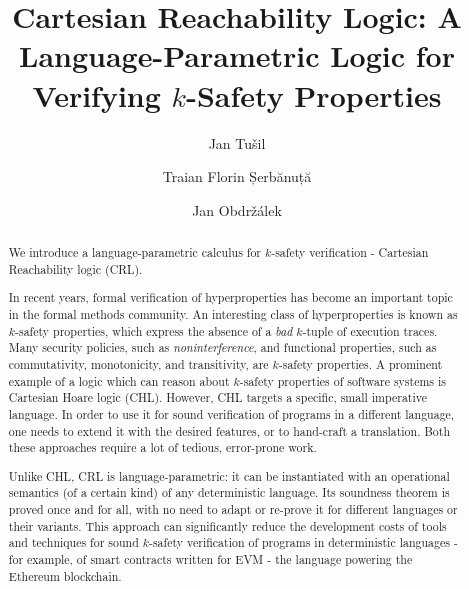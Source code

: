 \documentclass{easychair}
\title{Cartesian Reachability Logic: A Language-Parametric Logic for Verifying $k$-Safety Properties}
\author{
  Jan Tu\v{s}il \inst{1}
  \and Traian Florin Șerbănuță  \inst{2}
  \and Jan Obdržálek \inst{1}
}
\institute{
  Masaryk University,
  Brno, Czech Republic\\
  \email{jan.tusil@mail.muni.cz,obdrzalek@fi.muni.cz}
\and
   University of Bucharest,
   Bucharest, Romania\\
   \email{traian.serbanuta@unibuc.ro}\\
 }
\begin{document}
\maketitle


\begin{abstract}

  We introduce a language-parametric calculus
  for $k$-safety verification - Cartesian Reachability logic (CRL).

  In recent years, formal verification of hyperproperties has become an
  important topic in the formal methods community.  An interesting class of
  hyperproperties is known as $k$-safety properties, which express the absence
  of a \emph{bad} $k$-tuple of execution traces.  Many security policies, such
  as \emph{noninterference}, and functional properties, such as commutativity,
  monotonicity, and transitivity, are $k$-safety properties. A prominent example
  of a logic which can reason about $k$-safety properties of software systems
  is Cartesian Hoare logic (CHL). However, CHL targets a specific, small
  imperative language. In order to use it for sound verification of programs
  in a different language, one needs to extend it with the desired features,
  or to hand-craft a translation. Both these approaches require a lot of
  tedious, error-prone work.

  Unlike CHL, CRL is language-parametric:
  it can be instantiated with an operational semantics (of a certain kind) of any
  deterministic language. %
  Its soundness theorem is proved once and for all, with no need to adapt or re-prove it
  for different languages or their variants.
  This approach
  can significantly reduce
  the development costs of tools and techniques for sound $k$-safety
  verification of programs in deterministic languages - for example,
  of smart contracts written for EVM - the language powering the Ethereum blockchain.
  

  

\end{abstract}
\end{document}
